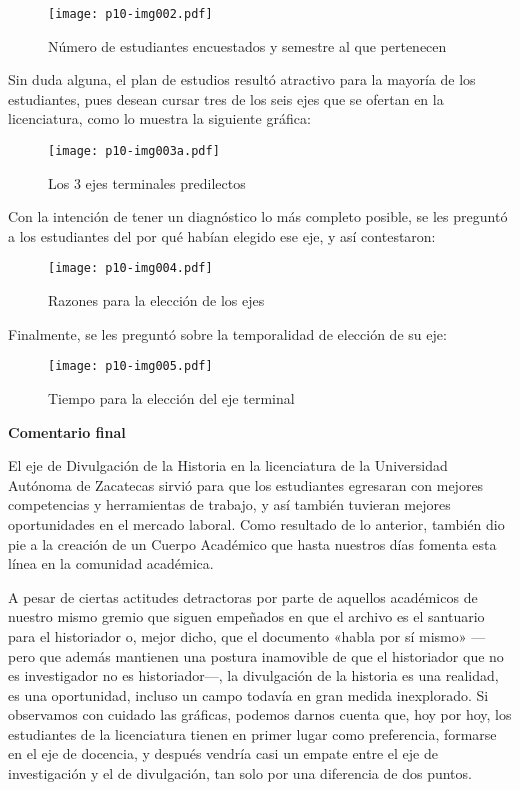 \bigskip
\begin{figure}[H]
\centering
\texttt{[image: p10-img002.pdf]} 
\caption{Número de estudiantes encuestados y semestre al que pertenecen}
\end{figure}

\bigskip 
Sin duda alguna, el plan de estudios resultó atractivo para la mayoría de los estudiantes, pues desean cursar tres de los seis ejes que se ofertan en la licenciatura, como lo muestra
la siguiente gráfica:


\begin{figure}[H]
\centering
\texttt{[image: p10-img003a.pdf]} 
\caption{Los 3 ejes terminales predilectos}
\end{figure}

\bigskip
Con la intención de tener un diagnóstico lo más completo posible, se les
preguntó a los estudiantes del por qué habían elegido ese eje, y así contestaron:


\bigskip
\begin{figure}[H]
\centering
\texttt{[image: p10-img004.pdf]} 
\caption{Razones para la elección de los ejes}
\end{figure}


\bigskip
Finalmente, se les preguntó sobre la temporalidad de elección de su eje:


\bigskip
\begin{figure}[H]
\centering
\texttt{[image: p10-img005.pdf]} 
\caption{Tiempo para la elección del eje terminal}
\end{figure}




\bigskip
\textbf{Comentario final}

El eje de Divulgación de la Historia en la licenciatura de la Universidad
Autónoma de Zacatecas sirvió para que los estudiantes egresaran con mejores
competencias y herramientas de trabajo, y así también tuvieran mejores
oportunidades en el mercado laboral. Como resultado de lo anterior, también dio
pie a la creación de un Cuerpo Académico que hasta nuestros días fomenta esta
línea en la comunidad académica.

A pesar de ciertas actitudes detractoras por parte de aquellos académicos de nuestro
mismo gremio que siguen empeñados en que el archivo es el santuario para el
historiador o, mejor dicho, que el documento «habla por sí mismo»  ---pero que
además mantienen una postura inamovible de que el historiador que no es investigador no
es historiador---, la divulgación de la historia es una realidad, es una
oportunidad, incluso un campo todavía en gran medida inexplorado. Si observamos
con cuidado las gráficas, podemos darnos cuenta que, hoy por hoy, los
estudiantes de la licenciatura tienen en primer lugar como preferencia,
formarse en el eje de docencia, y después vendría casi un empate entre el eje de
investigación y el de divulgación, tan solo por una diferencia de dos puntos.

